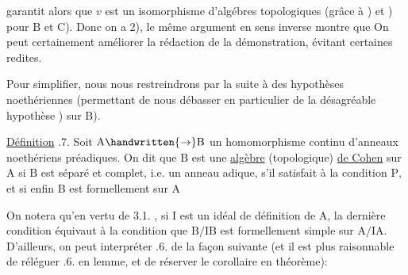 
garantit alors que $v$ est un isomorphisme d'algébres topologiques (grâce à ) et ) pour $\mathrm B$ et $\mathrm C$). Donc  on a 2),   le même argument en sens inverse montre que   On peut certainement améliorer la rédaction de la démonstration, évitant certaines redites.

Pour simplifier, nous nous restreindrons par la suite à des hypothèses noethériennes (permettant de nous débasser en particulier de la désagréable hypothèse ) sur $\mathrm B$).

\uline{Définition} .7. Soit $\mathrm A\handwritten{\to}\mathrm B$ un homomorphisme continu d'anneaux noethériens préadiques. On dit que $\mathrm B$ est une \uline{algèbre} (topologique) \uline{de Cohen} sur $\mathrm A$ si  $\mathrm B$ est séparé et complet, i.e.  un anneau adique,  s'il satisfait à la condition $\mathrm P$, et si enfin  $\mathrm B$ est formellement  sur $\mathrm A$ 

On notera qu'en vertu de 3.1. , si $\mathrm I$ est un idéal de définition de $\mathrm A$, la dernière condition équivaut à la condition que $\mathrm B/\mathrm{IB}$ est formellement simple sur $\mathrm A/\mathrm{IA}$. D'ailleurs, on peut interpréter .6. de la façon suivante (et il est  plus raisonnable de réléguer .6. en lemme, et de réserver le corollaire en théorème):

